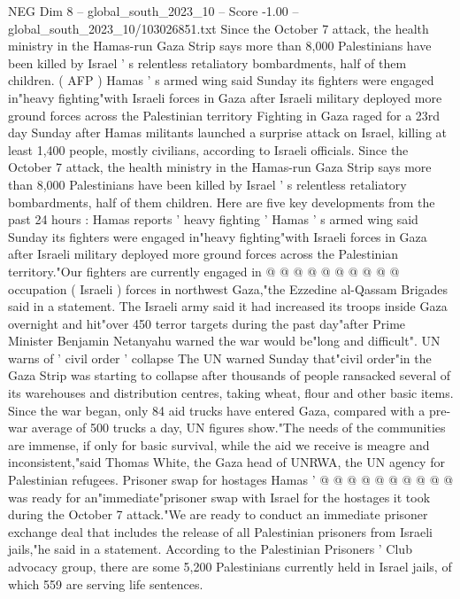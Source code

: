 \begin{textsample}{NEG Dim 8 – global\_south\_2023\_10 – Score -1.00 – global\_south\_2023\_10/103026851.txt}  \label{ex:f8_neg_093}
Since the October 7 attack, the health ministry in the Hamas-run Gaza Strip says more than 8,000 Palestinians have been killed by Israel ' s relentless retaliatory bombardments, half of them children. ( AFP ) Hamas ' s armed wing said Sunday its fighters were engaged in"heavy fighting"with Israeli forces in Gaza after Israeli military deployed more ground forces across the Palestinian territory Fighting in Gaza raged for a 23rd day Sunday after Hamas militants launched a surprise attack on Israel, killing at least 1,400 people, mostly civilians, according to Israeli officials.
Since the October 7 attack, the health ministry in the Hamas-run Gaza Strip says more than 8,000 Palestinians have been killed by Israel ' s relentless retaliatory bombardments, half of them children.
Here are five key developments from the past 24 hours : Hamas reports ' heavy fighting ' Hamas ' s armed wing said Sunday its fighters were engaged in"heavy fighting"with Israeli forces in Gaza after Israeli military deployed more ground forces across the Palestinian territory."Our fighters are currently engaged in @ @ @ @ @ @ @ @ @ @ occupation ( Israeli ) forces in northwest Gaza,"the Ezzedine al-Qassam Brigades said in a statement.
The Israeli army said it had increased its troops inside Gaza overnight and hit"over 450 terror targets during the past day"after Prime Minister Benjamin Netanyahu warned the war would be"long and difficult".
UN warns of ' civil order ' collapse The UN warned Sunday that"civil order"in the Gaza Strip was starting to collapse after thousands of people ransacked several of its warehouses and distribution centres, taking wheat, flour and other basic items.
Since the war began, only 84 aid trucks have entered Gaza, compared with a pre-war average of 500 trucks a day, UN figures show."The needs of the communities are immense, if only for basic survival, while the aid we receive is meagre and inconsistent,"said Thomas White, the Gaza head of UNRWA, the UN agency for Palestinian refugees.
Prisoner swap for hostages Hamas ' @ @ @ @ @ @ @ @ @ @ was ready for an"immediate"prisoner swap with Israel for the hostages it took during the October 7 attack."We are ready to conduct an immediate prisoner exchange deal that includes the release of all Palestinian prisoners from Israeli jails,"he said in a statement.
According to the Palestinian Prisoners ' Club advocacy group, there are some 5,200 Palestinians currently held in Israel jails, of which 559 are serving life sentences.

\end{textsample}
